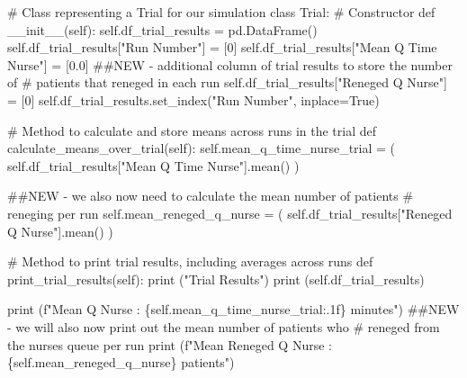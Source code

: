 \documentclass[
  letterpaper,
  DIV=11,
  numbers=noendperiod]{scrreprt}
\newenvironment{Shaded}{\begin{snugshade}}{\end{snugshade}}
\newcommand{\BuiltInTok}[1]{\textcolor[rgb]{0.00,0.23,0.31}{#1}}
\newcommand{\CommentTok}[1]{\textcolor[rgb]{0.37,0.37,0.37}{#1}}
\newcommand{\DecValTok}[1]{\textcolor[rgb]{0.68,0.00,0.00}{#1}}
\newcommand{\FloatTok}[1]{\textcolor[rgb]{0.68,0.00,0.00}{#1}}
\newcommand{\FunctionTok}[1]{\textcolor[rgb]{0.28,0.35,0.67}{#1}}
\newcommand{\KeywordTok}[1]{\textcolor[rgb]{0.00,0.23,0.31}{#1}}
\newcommand{\NormalTok}[1]{\textcolor[rgb]{0.00,0.23,0.31}{#1}}
\newcommand{\OperatorTok}[1]{\textcolor[rgb]{0.37,0.37,0.37}{#1}}
\newcommand{\SpecialCharTok}[1]{\textcolor[rgb]{0.37,0.37,0.37}{#1}}
\newcommand{\SpecialStringTok}[1]{\textcolor[rgb]{0.13,0.47,0.30}{#1}}
\newcommand{\StringTok}[1]{\textcolor[rgb]{0.13,0.47,0.30}{#1}}
\newcommand{\VariableTok}[1]{\textcolor[rgb]{0.07,0.07,0.07}{#1}}
\begin{document}
\begin{tcolorbox}
\begin{Shaded}
\begin{Highlighting}[]
\CommentTok{\# Class representing a Trial for our simulation}
\KeywordTok{class}\NormalTok{ Trial:}
    \CommentTok{\# Constructor}
    \KeywordTok{def}  \FunctionTok{\_\_init\_\_}\NormalTok{(}\VariableTok{self}\NormalTok{):}
        \VariableTok{self}\NormalTok{.df\_trial\_results }\OperatorTok{=}\NormalTok{ pd.DataFrame()}
        \VariableTok{self}\NormalTok{.df\_trial\_results[}\StringTok{"Run Number"}\NormalTok{] }\OperatorTok{=}\NormalTok{ [}\DecValTok{0}\NormalTok{]}
        \VariableTok{self}\NormalTok{.df\_trial\_results[}\StringTok{"Mean Q Time Nurse"}\NormalTok{] }\OperatorTok{=}\NormalTok{ [}\FloatTok{0.0}\NormalTok{]}
        \CommentTok{\#\#NEW {-} additional column of trial results to store the number of}
        \CommentTok{\# patients that reneged in each run}
        \VariableTok{self}\NormalTok{.df\_trial\_results[}\StringTok{"Reneged Q Nurse"}\NormalTok{] }\OperatorTok{=}\NormalTok{ [}\DecValTok{0}\NormalTok{]}
        \VariableTok{self}\NormalTok{.df\_trial\_results.set\_index(}\StringTok{"Run Number"}\NormalTok{, inplace}\OperatorTok{=}\VariableTok{True}\NormalTok{)}

    \CommentTok{\# Method to calculate and store means across runs in the trial}
    \KeywordTok{def}\NormalTok{ calculate\_means\_over\_trial(}\VariableTok{self}\NormalTok{):}
        \VariableTok{self}\NormalTok{.mean\_q\_time\_nurse\_trial }\OperatorTok{=}\NormalTok{ (}
            \VariableTok{self}\NormalTok{.df\_trial\_results[}\StringTok{"Mean Q Time Nurse"}\NormalTok{].mean()}
\NormalTok{        )}

        \CommentTok{\#\#NEW {-} we also now need to calculate the mean number of patients}
        \CommentTok{\# reneging per run}
        \VariableTok{self}\NormalTok{.mean\_reneged\_q\_nurse }\OperatorTok{=}\NormalTok{ (}
            \VariableTok{self}\NormalTok{.df\_trial\_results[}\StringTok{"Reneged Q Nurse"}\NormalTok{].mean()}
\NormalTok{        )}

    \CommentTok{\# Method to print trial results, including averages across runs}
    \KeywordTok{def}\NormalTok{ print\_trial\_results(}\VariableTok{self}\NormalTok{):}
        \BuiltInTok{print}\NormalTok{ (}\StringTok{"Trial Results"}\NormalTok{)}
        \BuiltInTok{print}\NormalTok{ (}\VariableTok{self}\NormalTok{.df\_trial\_results)}

        \BuiltInTok{print}\NormalTok{ (}\SpecialStringTok{f"Mean Q Nurse : }\SpecialCharTok{\{}\VariableTok{self}\SpecialCharTok{.}\NormalTok{mean\_q\_time\_nurse\_trial}\SpecialCharTok{:.1f\}}\SpecialStringTok{ minutes"}\NormalTok{)}
        \CommentTok{\#\#NEW {-} we will also now print out the mean number of patients who}
        \CommentTok{\# reneged from the nurse\textquotesingle{}s queue per run}
        \BuiltInTok{print}\NormalTok{ (}\SpecialStringTok{f"Mean Reneged Q Nurse : }\SpecialCharTok{\{}\VariableTok{self}\SpecialCharTok{.}\NormalTok{mean\_reneged\_q\_nurse}\SpecialCharTok{\}}\SpecialStringTok{ patients"}\NormalTok{)}


\end{Highlighting}
\end{Shaded}
\end{tcolorbox}
\end{document}
